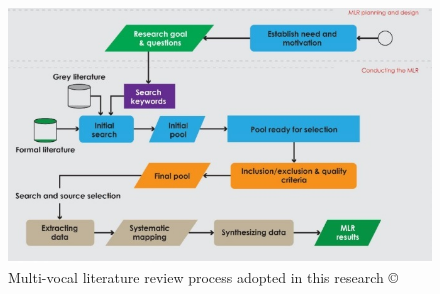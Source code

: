 \begin{figure}
  \includegraphics[width=\textwidth]{MLRprocess.jpg}
  \caption{Multi-vocal literature review process adopted in this research \copyright ~\cite{SALTAN2021106510}}
  \Description{}
 \label{fig:MLRprocess}
\end{figure}

